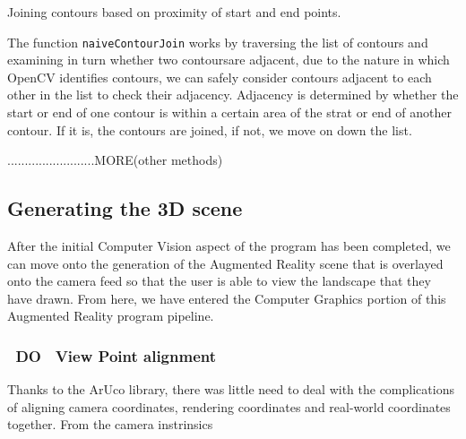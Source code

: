 \documentclass[11pt]{article}
\begin{document}
\begin{algorithm}
\DontPrintSemicolon
{}
\caption{Joining contours based on proximity of start and end points.}
\label{algo:naivecontourjoin}
\end{algorithm}

The function \texttt{naiveContourJoin} works by traversing the list of 
contours and examining in turn whether two contoursare adjacent, due to 
the nature in which OpenCV identifies contours, we can safely consider 
contours adjacent to each other in the list to check their adjacency. 
Adjacency is determined by whether the start or end of one contour is within
a certain area of the strat or end of another contour. If it is, the 
contours are joined, if not, we move on down the list.

.........................MORE(other methods)




\subsection{Generating the 3D scene}
After the initial Computer Vision aspect of the program has been completed,
we can move onto the generation of the Augmented Reality scene that is
overlayed onto the camera feed so that the user is able to view the
landscape that they have drawn. From here, we have entered the Computer
Graphics portion of this Augmented Reality program pipeline.

\subsubsection{~DO~ View Point alignment}
Thanks to the ArUco library, there was little need to deal with the
complications of aligning camera coordinates, rendering coordinates
and real-world coordinates together. From the camera instrinsics
\end{document}
